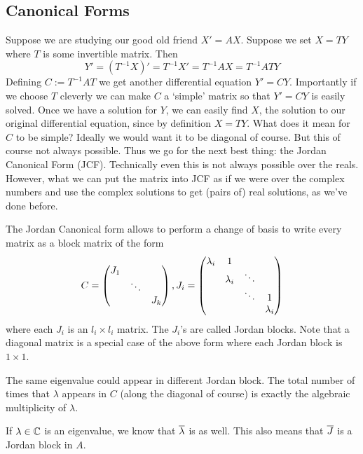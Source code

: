 \subsection{Canonical Forms}
Suppose we are studying our good old friend $X' = AX$. Suppose we set $X = TY$ where $T$ is some invertible matrix. Then
$$ Y' = (T^{-1} X)' = T^{-1} X' = T^{-1} AX = T^{-1}AT Y $$
Defining $C := T^{-1}AT$ we get another differential equation $Y' = CY$. Importantly if we choose $T$ cleverly we can make $C$ a `simple' matrix so that $Y' = CY$ is easily solved. Once we have a solution for $Y$, we can easily find $X$, the solution to our original differential equation, since by definition $X = TY$. What does it mean for $C$ to be simple? Ideally we would want it to be diagonal of course. But this of course not always possible. Thus we go for the next best thing: the Jordan Canonical Form (JCF). Technically even this is not always possible over the reals. However, what we can put the matrix into JCF as if we were over the complex numbers and use the complex solutions to get (pairs of) real solutions, as we've done before.

The Jordan Canonical form allows to perform a change of basis to write every matrix as a block matrix of the form
\begin{align*}
    C = \begin{pmatrix} J_1 & & \\ & \ddots &\\ & & J_k \end{pmatrix}, J_i = 
\begin{pmatrix}
\lambda_i & 1 \\
 & \lambda_i & \ddots\\
 & & \ddots & 1\\
& & &\lambda_i
\end{pmatrix}
\end{align*}
where each $J_i$ is an $l_i \times l_i$ matrix. The $J_i$'s are called Jordan blocks. Note that a diagonal matrix is a special case of the above form where each Jordan block is $1 \times 1$.
\begin{remark}
The same eigenvalue could appear in different Jordan block. The total number of times that $\lambda$ appears in $C$ (along the diagonal of course) is exactly the algebraic multiplicity of $\lambda$.
\end{remark}
\begin{remark}
If $\lambda \in \mathbb{C}$ is an eigenvalue, we know that $\overline{\lambda}$ is as well. This also means that $\overline{J}$ is a Jordan block in $A$.
\end{remark}
